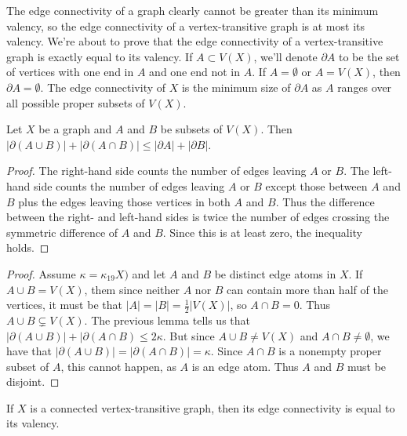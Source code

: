 The edge connectivity of a graph clearly cannot be greater than its minimum valency, so the edge connectivity of a vertex-transitive graph is at most its valency.  We're about to prove that the edge connectivity of a vertex-transitive graph is exactly equal to its valency.  If $A\subset V(X)$, we'll denote $\partial A$ to be the set of vertices with one end in $A$ and one end not in $A$.  If $A=\emptyset$ or $A=V(X)$, then $\partial A=\emptyset$.  The edge connectivity of $X$ is the minimum size of $\partial A$ as $A$ ranges over all possible proper subsets of $V(X)$.

\begin{lemma}
Let $X$ be a graph and $A$ and $B$ be subsets of $V(X)$.  Then $|\partial(A\cup B)|+|\partial(A\cap B)|\leq |\partial A|+|\partial B|$.  
\end{lemma} 
\begin{proof}
The right-hand side counts the number of edges leaving $A$ or $B$.  The left-hand side counts the number of edges leaving $A$ or $B$ except those between $A$ and $B$ plus the edges leaving those vertices in both $A$ and $B$.  Thus the difference between the right- and left-hand sides is twice the number of edges crossing the symmetric difference of $A$ and $B$.  Since this is at least zero, the inequality holds.
\end{proof}



\begin{proof}
Assume $\kappa=\kappa_19X)$ and let $A$ and $B$ be distinct edge atoms in $X$.  If $A\cup B=V(X)$, them since neither $A$ nor $B$ can contain more than half of the vertices, it must be that $|A|=|B|=\frac{1}{2}|V(X)|$, so $A\cap B=0$.  Thus $A\cup B \subsetneq V(X)$.  The previous lemma tells us that $|\partial (A\cup B)|+|\partial (A\cap B) \leq 2\kappa$.  But since $A\cup B\neq V(X)$ and $A\cap B\neq \emptyset$, we have that $|\partial(A\cup B)|=|\partial(A\cap B)|=\kappa$.  Since $A\cap B$ is a nonempty proper subset of $A$, this cannot happen, as $A$ is an edge atom.  Thus $A$ and $B$ must be disjoint.
\end{proof}

\begin{lemma}
If $X$ is a connected vertex-transitive graph, then its edge connectivity is equal to its valency.
\end{lemma}

